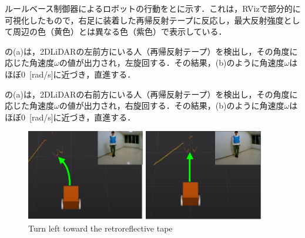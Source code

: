 \newpage

  ルールベース制御器によるロボットの行動をとに示す．これは，RVizで部分的に可視化したもので，右足に装着した再帰反射テープに反応し，最大反射強度として周辺の色（黄色）とは異なる色（紫色）で表示している．
  
  の(a)は，2DLiDARの左前方にいる人（再帰反射テープ）を検出し，その角度に応じた角速度$\omega$の値が出力され，左旋回する．その結果，(b)のように角速度$\omega$はほぼ0 \,[rad/s]に近づき，直進する．

  の(a)は，2DLiDARの右前方にいる人（再帰反射テープ）を検出し，その角度に応じた角速度$\omega$の値が出力され，右旋回する．その結果，(b)のように角速度$\omega$はほぼ0 \,[rad/s]に近づき，直進する．

\begin{figure}[h]
  \centering
  \begin{minipage}[c]{65mm} 
      \centering
      \includegraphics[height=40mm]{images/pdf/RobotGuidance_learning_turn_left_(a)}
  \end{minipage}
  \begin{minipage}[c]{65mm} 
      \centering
      \includegraphics[height=40mm]{images/pdf/RobotGuidance_learning_turn_left_(b)}
  \end{minipage}
  \caption{Turn left toward the retroreflective tape}
  \label{Fig:RobotGuidance_learning_turn_left}
\end{figure}

